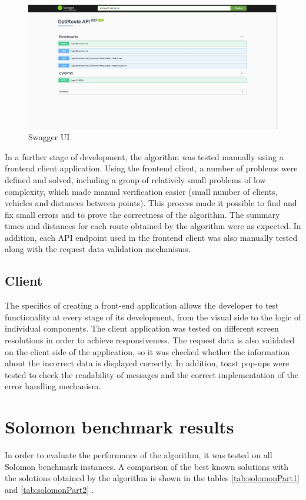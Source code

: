\documentclass[a4paper,twoside,12pt]{book}
\begin{document}
\begin{figure}
\centering
\includegraphics[width=\textwidth]{images/swagger.jpg}
\caption{Swagger UI}
\label{fig:swagger}
\end{figure}


In a further stage of development, the algorithm was tested manually using a frontend client application. Using the frontend client, a number of problems were defined and solved, including a group of relatively small problems of low complexity, which made manual verification easier (small number of clients, vehicles and distances between points). This process made it possible to find and fix small errors and to prove the correctness of the algorithm. The summary times and distances for each route obtained by the algorithm were as expected. 
In addition, each API endpoint used in the frontend client was also manually tested along with the request data validation mechanisms. 

\subsection{Client}
The specifics of creating a front-end application allows the developer to test functionality at every stage of its development, from the visual side to the logic of individual components. The client application was tested on different screen resolutions in order to achieve responsiveness. The request data is also validated on the client side of the application, so it was checked whether the information about the incorrect data is displayed correctly. In addition, toast pop-ups were tested to check the readability of messages and the correct implementation of the error handling mechanism. 

\section{Solomon benchmark results}
In order to evaluate the performance of the algorithm, it was tested on all Solomon benchmark instances. A comparison of the best known solutions with the solutions obtained by the algorithm is shown in the tables \ref{tab:solomonPart1} and \ref{tab:solomonPart2} \cite{bib:solomonSintef}.
\end{document}
